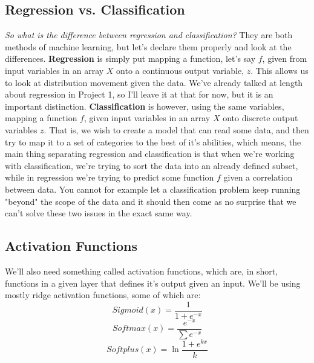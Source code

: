 \documentclass{article}
\begin{document}
\subsection{Regression vs. Classification}
\textit{So what is the difference between regression and classification?} \newline
They are both methods of machine learning, but let's declare them properly and look at the differences. \newline
\textbf{Regression} is simply put mapping a function, let's say $f$, given from input variables in an array $X$ onto a continuous output variable, $z$. This allows us to look at distribution movement given the data. We've already talked at length about regression in Project 1, so I'll leave it at that for now, but it is an important distinction. \newline
\textbf{Classification} is however, using the same variables, mapping a function $f$, given input variables in an array $X$ onto discrete output variables $z$. That is, we wish to create a model that can read some data, and then try to map it to a set of categories to the best of it's abilities, which means, the main thing separating regression and classification is that when we're working with classification, we're trying to sort the data into an already defined subset, while in regression we're trying to predict some function $f$ given a correlation between data. You cannot for example let a classification problem keep running "beyond" the scope of the data and it should then come as no surprise that we can't solve these two issues in the exact same way.
\subsection{Activation Functions}
We'll also need something called activation functions, which are, in short, functions in a given layer that defines it's output given an input.
\newline
We'll be using mostly ridge activation functions, some of which are:
\begin{equation}
    Sigmoid(x) = \frac{1}{1 + e^{-x}}
\end{equation}
\begin{equation}
    Softmax(x) = \frac{e^{-x}}{\sum e^{-x}}
\end{equation}
\begin{equation}
    Softplus(x) = \ln{\frac{1+e^{k x}}{k}}
\end{equation}
\end{document}
